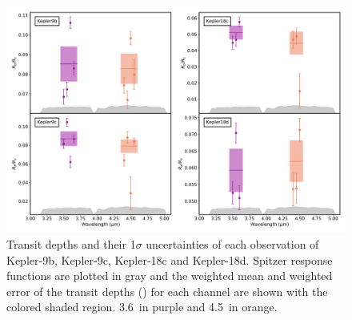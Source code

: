 \begin{subappendices}
\begin{figure}
    \centering
    \includegraphics[width =\linewidth]{TransitDepths.pdf}
    \caption{Transit depths and their 1$\sigma$ uncertainties of each observation of Kepler-9b, Kepler-9c, Kepler-18c and Kepler-18d. Spitzer response functions are plotted in gray and the weighted mean and weighted error of the transit depths (\rprss) for each channel are shown with the colored shaded region. 3.6\um~in purple and 4.5\um~in orange.}
    \label{P4:fig:TD}
\end{figure}


\end{subappendices}
